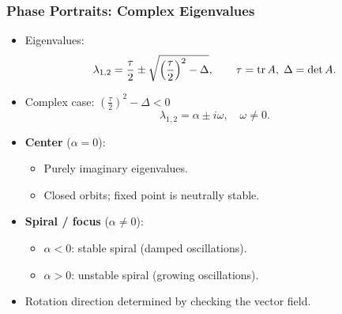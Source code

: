 \documentclass{beamer}
\begin{document}
\begin{frame}
  \frametitle{Phase Portraits: Complex Eigenvalues}

  \begin{itemize}
    \item Eigenvalues:
      \[
        \lambda_{1,2}
        = \frac{\tau}{2} \pm \sqrt{\Bigl(\frac{\tau}{2}\Bigr)^2 - \Delta},
        \qquad \tau=\operatorname{tr}A,\; \Delta=\det A.
      \]
    \item Complex case: $(\tfrac{\tau}{2})^2 - \Delta < 0$
      \[
        \lambda_{1,2} = \alpha \pm i\omega,\quad \omega\neq 0.
      \]

    \item \textbf{Center} ($\alpha=0$):
      \begin{itemize}
        \item Purely imaginary eigenvalues.
        \item Closed orbits; fixed point is neutrally stable.
      \end{itemize}

    \item \textbf{Spiral / focus} ($\alpha\neq 0$):
      \begin{itemize}
        \item $\alpha<0$: stable spiral (damped oscillations).
        \item $\alpha>0$: unstable spiral (growing oscillations).
      \end{itemize}

    \item Rotation direction determined by checking the vector field.
  \end{itemize}
\end{frame}
\end{document}
